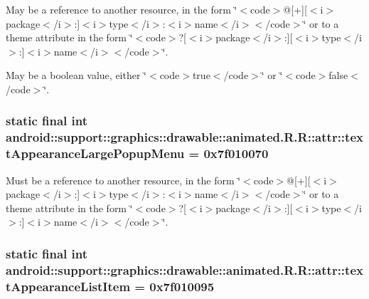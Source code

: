 May be a reference to another resource, in the form \char`\"{}$<$code$>$@\mbox{[}+\mbox{]}\mbox{[}$<$i$>$package$<$/i$>$:\mbox{]}$<$i$>$type$<$/i$>$:$<$i$>$name$<$/i$>$$<$/code$>$\char`\"{} or to a theme attribute in the form \char`\"{}$<$code$>$?\mbox{[}$<$i$>$package$<$/i$>$:\mbox{]}\mbox{[}$<$i$>$type$<$/i$>$:\mbox{]}$<$i$>$name$<$/i$>$$<$/code$>$\char`\"{}. 

May be a boolean value, either \char`\"{}$<$code$>$true$<$/code$>$\char`\"{} or \char`\"{}$<$code$>$false$<$/code$>$\char`\"{}. \hypertarget{classandroid_1_1support_1_1graphics_1_1drawable_1_1animated_1_1_r_1_1attr_3adbbd097629a31e698cb1256d8f21f6}{
\subsubsection[{textAppearanceLargePopupMenu}]{\setlength{\rightskip}{0pt plus 5cm}static final int android::support::graphics::drawable::animated.R.R::attr::textAppearanceLargePopupMenu = 0x7f010070}}
\label{classandroid_1_1support_1_1graphics_1_1drawable_1_1animated_1_1_r_1_1attr_3adbbd097629a31e698cb1256d8f21f6}


Must be a reference to another resource, in the form \char`\"{}$<$code$>$@\mbox{[}+\mbox{]}\mbox{[}$<$i$>$package$<$/i$>$:\mbox{]}$<$i$>$type$<$/i$>$:$<$i$>$name$<$/i$>$$<$/code$>$\char`\"{} or to a theme attribute in the form \char`\"{}$<$code$>$?\mbox{[}$<$i$>$package$<$/i$>$:\mbox{]}\mbox{[}$<$i$>$type$<$/i$>$:\mbox{]}$<$i$>$name$<$/i$>$$<$/code$>$\char`\"{}. \hypertarget{classandroid_1_1support_1_1graphics_1_1drawable_1_1animated_1_1_r_1_1attr_5aad695d82328429591c0ef9055d015e}{
\subsubsection[{textAppearanceListItem}]{\setlength{\rightskip}{0pt plus 5cm}static final int android::support::graphics::drawable::animated.R.R::attr::textAppearanceListItem = 0x7f010095}}
\label{classandroid_1_1support_1_1graphics_1_1drawable_1_1animated_1_1_r_1_1attr_5aad695d82328429591c0ef9055d015e}


